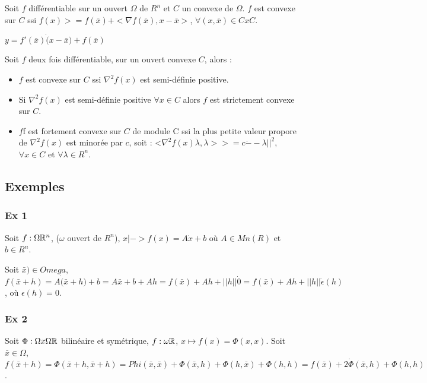		\begin{theoreme}
		Soit $f$ différentiable sur un ouvert $\Omega$ de $R^n$ et $C$ un convexe de $\Omega$.
		$f$ est convexe sur $C$ ssi $f(x) >= f(\bar{x}) + <\nabla f(\bar{x}), x-\bar{x}>$, $\forall (x, \bar{x}) \in C x C$.
		\end{theoreme}
		
		$y=f'(\bar{x}) \dot (x-\bar{x}) +f(\bar{x})$
		
		\begin{theoreme}
		Soit $f$ deux fois différentiable, sur un ouvert convexe $C$, alors :
		\begin{itemize}
			\item $f$ est convexe sur $C$ ssi $\nabla^2 f(x)$ est semi-définie positive.
			\item Si $\nabla^2 f(x)$ est semi-définie positive $\forall x \in C$ alors $f$ est strictement convexe sur $C$.
			\item $f$f est fortement convexe sur $C$ de module C ssi la plus petite valeur propore de $\nabla^2 f(x)$ est minorée par $c$, soit : <$\nabla^2 f(x) \dot \lambda, \lambda> >= c \dot --\lambda ||^2$, $\forall x \in C$ et $\forall \lambda \in R^n$.
		\end{itemize}
		\end{theoreme}
		
		
	\subsection{Exemples}
	
		\subsubsection{Ex 1}
		
		Soit $f:\Omega \mathbb{R}^n$, ($\omega$ ouvert de $R^n$), $x|-> f(x) = A \dot x +b$ où $A \in Mn(R)$ et $b \in R^n$.
		
		Soit $\bar{x}) \in Omega$, $f(\bar{x} +h) = A \dot (\bar{x}+h) + b = A \bar{x} + b + Ah = f(\bar{x}) + Ah + ||h|| \dot 0 = f(\bar{x}) + Ah + ||h|| \dot \epsilon (h)$, où $\epsilon (h) = 0$.
		
		
		
		\subsubsection{Ex 2}
		
		Soit $\Phi : \Omega x \Omega \mathbb{R}$ bilinéaire et symétrique, $f: \omega \mathbb{R}$, $x \mapsto f(x) = \Phi(x, x)$.
		Soit $\bar{x} \in \Omega$, $f(\bar{x}+h) = \Phi(\bar{x}+h, \bar{x}+h) = Phi(\bar{x}, \bar{x}) + \Phi(\bar{x}, h) + \Phi(h, \bar{x}) + \Phi(h, h) = f(\bar{x}) + 2 \dot \Phi(\bar{x}, h) + \Phi(h, h)$.
		
